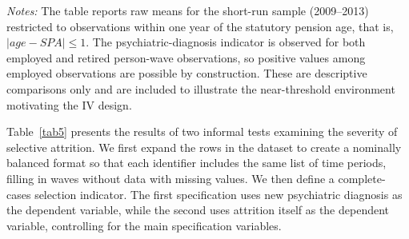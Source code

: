 \documentclass[arguments, manuscript, 11pt]{aastex631}
\begin{document}
\newpage
\begin{table}[htb!]
\centering
\caption{Near-threshold descriptive evidence in the short-run sample (within one year of the statutory pension age)}
\label{tabA5}
\tiny{{\singlespacing \emph{Notes:} The table reports raw means for the short-run sample (2009--2013) restricted to observations within one year of the statutory pension age, that is, $|age-SPA| \leq 1$. The psychiatric-diagnosis indicator is observed for both employed and retired person-wave observations, so positive values among employed observations are possible by construction. These are descriptive comparisons only and are included to illustrate the near-threshold environment motivating the IV design.}}
\end{table}

\newpage
Table~\ref{tab5} presents the results of two informal tests examining the severity of selective attrition. We first expand the rows in the dataset to create a nominally balanced format so that each identifier includes the same list of time periods, filling in waves without data with missing values. We then define a complete-cases selection indicator. The first specification uses new psychiatric diagnosis as the dependent variable, while the second uses attrition itself as the dependent variable, controlling for the main specification variables.
\end{document}
